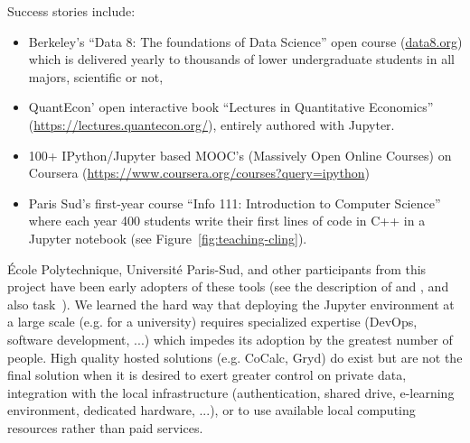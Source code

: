   Success stories include:
  \begin{itemize}
  \item Berkeley's ``Data 8: The foundations of Data Science'' open
    course (\url{data8.org}) which is delivered yearly to thousands of
    lower undergraduate students in all majors, scientific or not,
  \item QuantEcon' open interactive book ``Lectures in Quantitative
    Economics'' (\url{https://lectures.quantecon.org/}), entirely
    authored with Jupyter.
  \item 100+ IPython/Jupyter based MOOC's (Massively Open Online
    Courses) on Coursera
    (\url{https://www.coursera.org/courses?query=ipython})
  \item Paris Sud's first-year course ``Info 111: Introduction to
    Computer Science'' where each year 400 students write their first
    lines of code in C++ in a Jupyter notebook (see Figure~\ref{fig:teaching-cling}).
  \end{itemize}

  École Polytechnique, Université Paris-Sud, and other participants from this
  project have been early adopters of these tools (see the description of 
  and , and also task~).
  We learned the hard way that deploying the Jupyter environment at a
  large scale (e.g. for a university) requires specialized expertise
  (DevOps, software development, ...) which impedes its adoption
  by the greatest number of people. High quality hosted solutions
  (e.g. CoCalc\cite{Cocalc}, Gryd\cite{Gryd}) do exist but are not the final solution when it
  is desired to exert greater control on private data, integration with
  the local infrastructure (authentication, shared drive, e-learning
  environment, dedicated hardware, ...), or to use available local computing
  resources rather than paid services.


